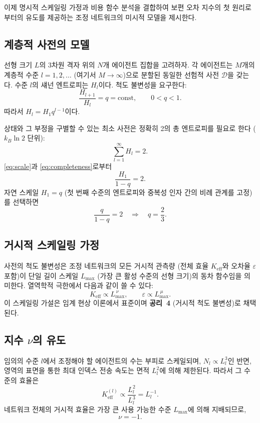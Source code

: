 \documentclass[11pt,a4paper]{article}
\newcommand{\Dir}{\mathcal{D}}
\begin{document}
	이제 명시적 스케일링 가정과 비용 함수 분석을 결합하여 보편 오차 지수의 첫 원리로부터의 유도를 제공하는 조정 네트워크의 미시적 모델을 제시한다.
	
	\subsection{계층적 사전의 모델}
	선형 크기 \(L\)의 3차원 격자 위의 \(N\)개 에이전트 집합을 고려하자. 각 에이전트는 \(M\)개의 계층적 수준 \(l = 1,2,\dots\) (여기서 \(M \to \infty\))으로 분할된 동일한 선험적 사전 \(\Dir\)을 갖는다. 수준 \(l\)의 섀넌 엔트로피는 \(H_l\)이다. 척도 불변성을 요구한다:
	\begin{equation}
		\frac{H_{l+1}}{H_l} = q = \text{const}, \qquad 0 < q < 1. \label{eq:scale}
	\end{equation}
	따라서 \(H_l = H_1 q^{l-1}\)이다.
	
	상태와 그 부정을 구별할 수 있는 최소 사전은 정확히 2의 총 엔트로피를 필요로 한다 (\(k_B \ln 2\) 단위):
	\begin{equation}
		\sum_{l=1}^{\infty} H_l = 2. \label{eq:completeness}
	\end{equation}
	\eqref{eq:scale}과 \eqref{eq:completeness}로부터
	\[
	\frac{H_1}{1-q} = 2.
	\]
	자연 스케일 \(H_1 = q\) (첫 번째 수준의 엔트로피와 중복성 인자 간의 비례 관계를 고정)를 선택하면
	\[
	\frac{q}{1-q} = 2 \quad\Longrightarrow\quad q = \frac{2}{3}. \label{eq:qval}
	\]
	
	\subsection{거시적 스케일링 가정}
	사전의 척도 불변성은 조정 네트워크의 모든 거시적 관측량 (전체 효율 \(K_{\mathrm{eff}}\)와 오차율 \(\varepsilon\) 포함)이 단일 길이 스케일 \(L_{\max}\) (가장 큰 활성 수준의 선형 크기)의 동차 함수임을 의미한다. 열역학적 극한에서 다음과 같이 쓸 수 있다:
	\begin{equation}
		K_{\mathrm{eff}} \propto L_{\max}^{\,\nu}, \qquad \varepsilon \propto L_{\max}^{\,\mu}. \label{eq:scaling-assume}
	\end{equation}
	이 스케일링 가설은 임계 현상 이론에서 표준이며 \textbf{공리~4} (거시적 척도 불변성)로 채택된다.
	
	\subsection{지수 \(\nu\)의 유도}
	임의의 수준 \(l\)에서 조정해야 할 에이전트의 수는 부피로 스케일되며, \(N_l \propto L_l^3\)인 반면, 영역의 표면을 통한 최대 인덱스 전송 속도는 면적 \(L_l^2\)에 의해 제한된다. 따라서 그 수준의 효율은
	\[
	K_{\mathrm{eff}}^{(l)} \propto \frac{L_l^2}{L_l^3} = L_l^{-1}.
	\]
	네트워크 전체의 거시적 효율은 가장 큰 사용 가능한 수준 \(L_{\max}\)에 의해 지배되므로,
	\[
	\nu = -1. \label{eq:nu}
	\]
	
\end{document}
